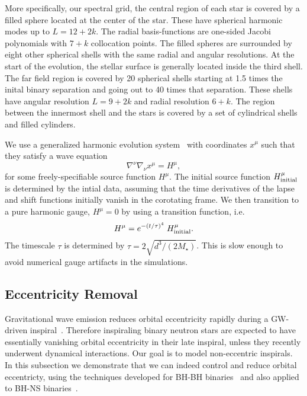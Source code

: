 {More specifically, our spectral
grid, the central region of each star is covered by a filled sphere
located at the center of the star. These have spherical harmonic modes
up to $L = 12+2k$.  The radial basis-functions are one-sided Jacobi
polynomials with $7+k$ collocation points. The filled spheres are
surrounded by eight other spherical shells with the same radial and
angular resolutions. At the start of the evolution, the stellar
surface is generally located inside the third shell.  The far field
region is covered by 20 spherical shells starting at 1.5 times the
inital binary separation and going out to 40 times that
separation. These shells have angular resolution $L=9+2k$ and radial
resolution $6+k$.  The region between the innermost shell and the
stars is covered by a set of cylindrical shells and filled cylinders.

We use a generalized harmonic evolution system~\cite{Pretorius2006,Pretorius2005a,Lindblom2006} with 
 coordinates $x^{\mu}$ such that they satisfy a
wave equation
\begin{equation}
\nabla^{\nu}\nabla_{\nu}x^{\mu} = H^{\mu},
\end{equation}
for some freely-specifiable source function $H^{\mu}$. The initial
source function $H^\mu_{\rm initial}$ is determined by the intial
data, assuming that the time derivatives of the lapse and
shift functions initially vanish in the corotating frame. 
We then transition to a pure harmonic gauge, $H^{\mu}=0$ by
using a transition function, i.e.
\begin{equation}
H^\mu = e^{-\left(t/\tau\right)^4}\; H^\mu_{\rm initial}.
\end{equation}
The timescale $\tau$ is determined by $\tau=2\sqrt{d^3/(2M_\star)}$.
This is slow enough to avoid numerical gauge artifacts in the simulations.

\subsection{Eccentricity Removal}
\label{sec:EccRemoval}

Gravitational wave emission reduces orbital eccentricity rapidly during
a GW-driven inspiral~\cite{PetersMathews1963,Peters1964}.  Therefore
inspiraling binary neutron stars are expected to have essentially
vanishing orbital eccentricity in their late inspiral, unless they recently
underwent dynamical interactions.  Our goal is to model
non-eccentric inspirals.  In this subsection we demonstrate that we can
indeed control and reduce orbital eccentricty, using the techniques
developed for BH-BH
binaries~\cite{Pfeiffer-Brown-etal:2007,Boyle2007,Buonanno:2010yk}
and also applied to BH-NS binaries~\cite{FoucartEtAl:2008}.


}
